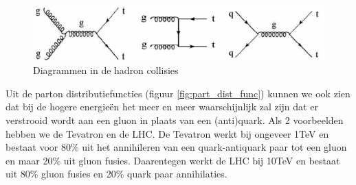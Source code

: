\documentclass[../main.tex]{subfiles}
\begin{document}
\begin{figure}[h]
    \centering
    \includegraphics[width=0.8\linewidth]{QCD/hadr_coll_diagr.png}
    \caption{Diagrammen in de hadron collisies}%
    \label{fig:QCD/hadr_coll_diagr}
\end{figure}

Uit de parton distributiefuncties (figuur \ref{fig:part_dist_func}) kunnen we ook zien dat bij de hogere energieën het meer en meer waarschijnlijk zal zijn dat er verstrooid wordt aan een gluon in plaats van een (anti)quark. Als 2 voorbeelden hebben we de Tevatron en de LHC. De Tevatron werkt bij ongeveer 1TeV en bestaat voor 80\% uit het annihileren van een quark-antiquark paar tot een gluon en maar 20\% uit gluon fusies. Daarentegen werkt de LHC bij 10TeV en bestaat uit 80\% gluon fusies en 20\% quark paar annihilaties.
\end{document}
